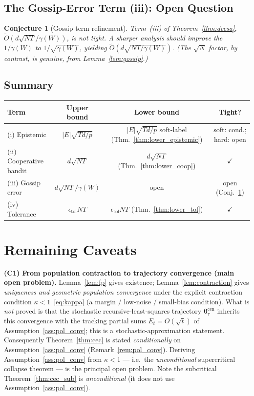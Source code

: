 \documentclass[11pt]{article}
\newtheorem{conjecture}[theorem]{Conjecture}
\begin{document}
\subsection{The Gossip-Error Term (iii): Open Question}

\begin{conjecture}[Gossip term refinement]\label{conj:gossip}
Term~(iii) of Theorem~\ref{thm:dcesa},
$\widetilde{O}(d\sqrt{NT}/\gamma(W))$, is not tight.  A sharper
analysis should improve the $1/\gamma(W)$ to $1/\sqrt{\gamma(W)}$,
yielding $\widetilde{O}(d\sqrt{NT/\gamma(W)})$.  (The $\sqrt N$ factor,
by contrast, is genuine, from Lemma~\ref{lem:gossip}.)
\end{conjecture}

\subsection{Summary}

\begin{center}
\begin{tabular}{lccc}
\hline
Term & Upper bound & Lower bound & Tight?\\
\hline
(i) Epistemic & $|E|\sqrt{Td/\bar{p}}$ &
$|E|\sqrt{Td/\bar{p}}$ soft-label (Thm.~\ref{thm:lower_epistemic}) &
soft: cond.; hard: open\\
(ii) Cooperative bandit & $d\sqrt{NT}$ &
$d\sqrt{NT}$ (Thm.~\ref{thm:lower_coop}) & $\checkmark$\\
(iii) Gossip error & $d\sqrt{NT}/\gamma(W)$ & open &
open (Conj.~\ref{conj:gossip})\\
(iv) Tolerance & $\epsilon_{\mathrm{tol}}NT$ &
$\epsilon_{\mathrm{tol}}NT$ (Thm.~\ref{thm:lower_tol}) & $\checkmark$\\
\hline
\end{tabular}
\end{center}

\section{Remaining Caveats}\label{sec:caveats}

\textbf{(C1) From population contraction to trajectory convergence
(main open problem).}
Lemma~\ref{lem:fp} gives existence; Lemma~\ref{lem:contraction} gives
\emph{uniqueness and geometric population convergence} under the
explicit contraction condition $\kappa<1$~\eqref{eq:kappa} (a margin /
low-noise / small-bias condition).  What is \emph{not} proved is that
the stochastic recursive-least-squares trajectory
$\bm{\theta}_\tau^{\mathrm{cen}}$ inherits this convergence with the
tracking partial sums $E_t=O(\sqrt t)$ of
Assumption~\ref{ass:pol_conv}; this is a stochastic-approximation
statement.  Consequently Theorem~\ref{thm:cec} is stated
\emph{conditionally} on Assumption~\ref{ass:pol_conv}
(Remark~\ref{rem:pol_conv}).  Deriving Assumption~\ref{ass:pol_conv}
from $\kappa<1$ --- i.e.\ the \emph{unconditional} supercritical
collapse theorem --- is the principal open problem.  Note the
subcritical Theorem~\ref{thm:cec_sub} is \emph{unconditional}
(it does not use Assumption~\ref{ass:pol_conv}).
\end{document}
